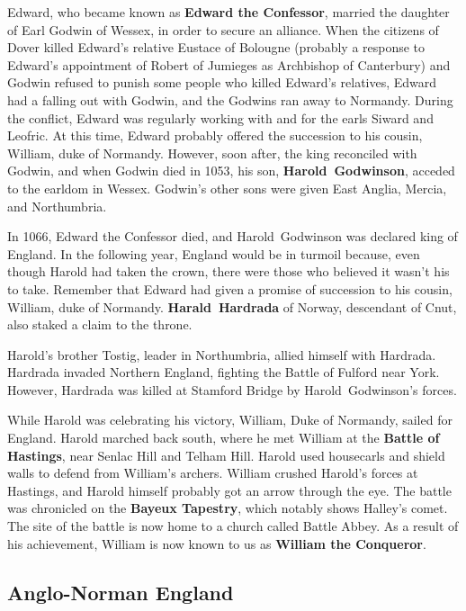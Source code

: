 Edward, who became known as \textbf{Edward the Confessor},
married the daughter of Earl Godwin of Wessex, in order to secure an alliance.
When the citizens of Dover killed Edward's relative Eustace of Bolougne
(probably a response to Edward's appointment of Robert of Jumieges as Archbishop of Canterbury)
and Godwin refused to punish some people who killed Edward's relatives,
Edward had a falling out with Godwin, and the Godwins ran away to Normandy.
During the conflict, Edward was regularly working with and for the earls Siward and Leofric.
At this time, Edward probably offered the succession to his cousin, William, duke of Normandy.
However, soon after, the king reconciled with Godwin, and when Godwin died in 1053,
his son, \textbf{Harold~Godwinson}, acceded to the earldom in Wessex.
Godwin's other sons were given East Anglia, Mercia, and Northumbria.

In 1066, Edward the Confessor died, and Harold~Godwinson was declared king of England.
In the following year, England would be in turmoil because,
even though Harold had taken the crown, there were those who believed it wasn't his to take.
Remember that Edward had given a promise of succession to his cousin, William, duke of Normandy.
\textbf{Harald~Hardrada} of Norway, descendant of Cnut, also staked a claim to the throne.

Harold's brother Tostig, leader in Northumbria, allied himself with Hardrada.
Hardrada invaded Northern England, fighting the Battle of Fulford near York.
However, Hardrada was killed at Stamford Bridge by Harold~Godwinson's forces.

While Harold was celebrating his victory, William, Duke of Normandy, sailed for England.
Harold marched back south, where he met William at the \textbf{Battle of Hastings}, near Senlac Hill and Telham Hill.
Harold used housecarls and shield walls to defend from William's archers.
William crushed Harold's forces at Hastings, and Harold himself probably got an arrow through the eye.
The battle was chronicled on the \textbf{Bayeux Tapestry}, which notably shows Halley's comet.
The site of the battle is now home to a church called Battle Abbey.
As a result of his achievement, William is now known to us as \textbf{William the Conqueror}.

\subsection*{Anglo-Norman England}

